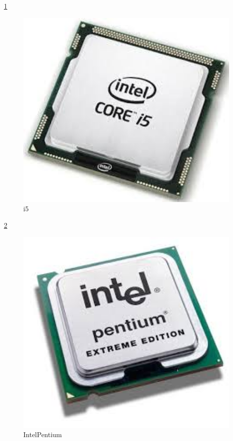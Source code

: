 \ref{i5}
\begin{figure}[ht]
\centerline{\includegraphics[width=1\textwidth]{figures/i5.jpg}}
\caption{i5}
\label{i5}
\end{figure}

\ref{IntelPentium}
\begin{figure}[ht]
\centerline{\includegraphics[width=1\textwidth]{figures/IntelPentium.jpg}}
\caption{IntelPentium}
\label{IntelPentium}
\end{figure}

